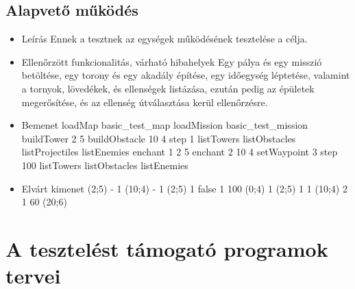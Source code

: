 \subsection{Alapvető működés}
\begin{itemize}
\item Leírás\newline
Ennek a tesztnek az egységek működésének tesztelése a célja.
\item Ellenőrzött funkcionalitás, várható hibahelyek
Egy pálya és egy misszió betöltése, egy torony és egy akadály építése, egy időegység léptetése, valamint a tornyok, lövedékek, és ellenségek listázása, ezután pedig az épületek megerősítése, és az ellenség útválasztása kerül ellenőrzésre.
\item Bemenet\newline
loadMap basic_test_map
loadMission basic_test_mission
buildTower 2 5
buildObstacle 10 4
step 1
listTowers
listObstacles
listProjectiles
listEnemies
enchant 1 2 5
enchant 2 10 4
setWaypoint 3
step 100
listTowers
listObstacles
listEnemies
\item Elvárt kimenet	(2;5)	-
1	(10;4)	-
1	(2;5)	1	false
1	100	(0;4)
1	(2;5)	1
1	(10;4)	2
1	60	(20;6)
\end{itemize}

\section{A tesztelést támogató programok tervei}


